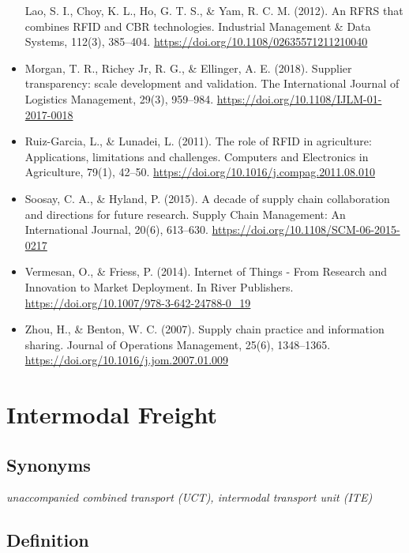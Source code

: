 \documentclass[
]{book}
\begin{document}
\begin{itemize}
  Lao, S. I., Choy, K. L., Ho, G. T. S., \& Yam, R. C. M. (2012). An RFRS that combines RFID and CBR technologies. Industrial Management \& Data Systems, 112(3), 385--404. \url{https://doi.org/10.1108/02635571211210040}
\item
  Morgan, T. R., Richey Jr, R. G., \& Ellinger, A. E. (2018). Supplier transparency: scale development and validation. The International Journal of Logistics Management, 29(3), 959--984. \url{https://doi.org/10.1108/IJLM-01-2017-0018}
\item
  Ruiz-Garcia, L., \& Lunadei, L. (2011). The role of RFID in agriculture: Applications, limitations and challenges. Computers and Electronics in Agriculture, 79(1), 42--50. \url{https://doi.org/10.1016/j.compag.2011.08.010}
\item
  Soosay, C. A., \& Hyland, P. (2015). A decade of supply chain collaboration and directions for future research. Supply Chain Management: An International Journal, 20(6), 613--630. \url{https://doi.org/10.1108/SCM-06-2015-0217}
\item
  Vermesan, O., \& Friess, P. (2014). Internet of Things - From Research and Innovation to Market Deployment. In River Publishers. \url{https://doi.org/10.1007/978-3-642-24788-0_19}
\item
  Zhou, H., \& Benton, W. C. (2007). Supply chain practice and information sharing. Journal of Operations Management, 25(6), 1348--1365. \url{https://doi.org/10.1016/j.jom.2007.01.009}
\end{itemize}

\hypertarget{intermodal_freight}{%
\section{Intermodal Freight}\label{intermodal_freight}}

\hypertarget{synonyms-26}{%
\subsection*{Synonyms}\label{synonyms-26}}

\emph{unaccompanied combined transport (UCT), intermodal transport unit (ITE)}

\hypertarget{definition-29}{%
\subsection*{Definition}\label{definition-29}}
\end{document}
